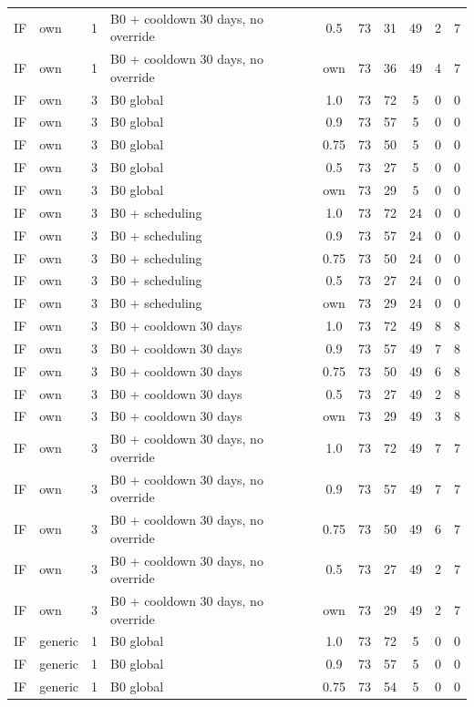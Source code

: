 \begin{longtable}{lllp{4.4cm}cccccc}
IF & own & 1 & B0 + cooldown 30 days, no override & 0.5 & 73 & 31 & 49 & 2 & 7 \\
IF & own & 1 & B0 + cooldown 30 days, no override & own & 73 & 36 & 49 & 4 & 7 \\
IF & own & 3 & B0 global & 1.0 & 73 & 72 & 5 & 0 & 0 \\
IF & own & 3 & B0 global & 0.9 & 73 & 57 & 5 & 0 & 0 \\
IF & own & 3 & B0 global & 0.75 & 73 & 50 & 5 & 0 & 0 \\
IF & own & 3 & B0 global & 0.5 & 73 & 27 & 5 & 0 & 0 \\
IF & own & 3 & B0 global & own & 73 & 29 & 5 & 0 & 0 \\
IF & own & 3 & B0 + scheduling & 1.0 & 73 & 72 & 24 & 0 & 0 \\
IF & own & 3 & B0 + scheduling & 0.9 & 73 & 57 & 24 & 0 & 0 \\
IF & own & 3 & B0 + scheduling & 0.75 & 73 & 50 & 24 & 0 & 0 \\
IF & own & 3 & B0 + scheduling & 0.5 & 73 & 27 & 24 & 0 & 0 \\
IF & own & 3 & B0 + scheduling & own & 73 & 29 & 24 & 0 & 0 \\
IF & own & 3 & B0 + cooldown 30 days & 1.0 & 73 & 72 & 49 & 8 & 8 \\
IF & own & 3 & B0 + cooldown 30 days & 0.9 & 73 & 57 & 49 & 7 & 8 \\
IF & own & 3 & B0 + cooldown 30 days & 0.75 & 73 & 50 & 49 & 6 & 8 \\
IF & own & 3 & B0 + cooldown 30 days & 0.5 & 73 & 27 & 49 & 2 & 8 \\
IF & own & 3 & B0 + cooldown 30 days & own & 73 & 29 & 49 & 3 & 8 \\
IF & own & 3 & B0 + cooldown 30 days, no override & 1.0 & 73 & 72 & 49 & 7 & 7 \\
IF & own & 3 & B0 + cooldown 30 days, no override & 0.9 & 73 & 57 & 49 & 7 & 7 \\
IF & own & 3 & B0 + cooldown 30 days, no override & 0.75 & 73 & 50 & 49 & 6 & 7 \\
IF & own & 3 & B0 + cooldown 30 days, no override & 0.5 & 73 & 27 & 49 & 2 & 7 \\
IF & own & 3 & B0 + cooldown 30 days, no override & own & 73 & 29 & 49 & 2 & 7 \\
IF & generic & 1 & B0 global & 1.0 & 73 & 72 & 5 & 0 & 0 \\
IF & generic & 1 & B0 global & 0.9 & 73 & 57 & 5 & 0 & 0 \\
IF & generic & 1 & B0 global & 0.75 & 73 & 54 & 5 & 0 & 0 \\

\end{longtable}
